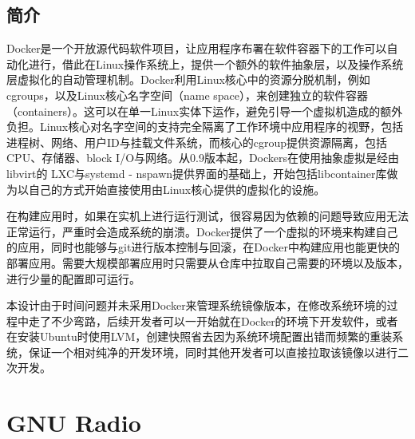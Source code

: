 		\subsection{简介}
			\par Docker是一个开放源代码软件项目，让应用程序布署在软件容器下的工作可以自动化进行，借此在Linux操作系统上，提供一个额外的软件抽象层，以及操作系统层虚拟化的自动管理机制。Docker利用Linux核心中的资源分脱机制，例如cgroups，以及Linux核心名字空间（name space），来创建独立的软件容器（containers）。这可以在单一Linux实体下运作，避免引导一个虚拟机造成的额外负担。Linux核心对名字空间的支持完全隔离了工作环境中应用程序的视野，包括进程树、网络、用户ID与挂载文件系统，而核心的cgroup提供资源隔离，包括CPU、存储器、block I/O与网络。从0.9版本起，Dockers在使用抽象虚拟是经由libvirt的 LXC与systemd - nspawn提供界面的基础上，开始包括libcontainer库做为以自己的方式开始直接使用由Linux核心提供的虚拟化的设施。
			\par 在构建应用时，如果在实机上进行运行测试，很容易因为依赖的问题导致应用无法正常运行，严重时会造成系统的崩溃。Docker提供了一个虚拟的环境来构建自己的应用，同时也能够与git进行版本控制与回滚，在Docker中构建应用也能更快的部署应用。需要大规模部署应用时只需要从仓库中拉取自己需要的环境以及版本，进行少量的配置即可运行。
			\par 本设计由于时间问题并未采用Docker来管理系统镜像版本，在修改系统环境的过程中走了不少弯路，后续开发者可以一开始就在Docker的环境下开发软件，或者在安装Ubuntu时使用LVM，创建快照省去因为系统环境配置出错而频繁的重装系统，保证一个相对纯净的开发环境，同时其他开发者可以直接拉取该镜像以进行二次开发。
	\section{GNU Radio}
		\label{sec:gnuradio}
